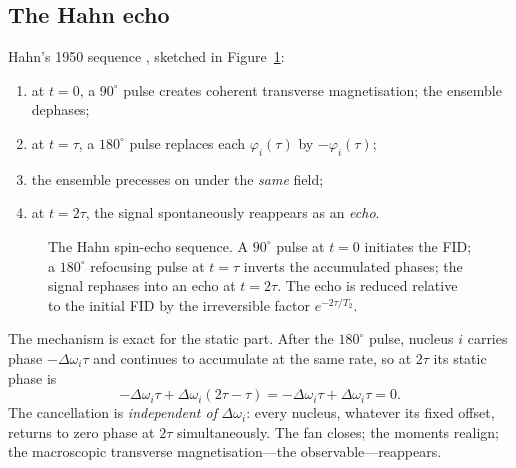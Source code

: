\documentclass[11pt,a4paper]{article}
\theoremstyle{thmstyle}
\theoremstyle{definition}
\theoremstyle{remark}
\newcommand{\Ttwo}{T_{2}}
\begin{document}
\subsection{The Hahn echo}
\label{sec:hahn}

Hahn's 1950 sequence \citep{hahn1950}, sketched in
Figure~\ref{fig:pulse}:
\begin{enumerate}[leftmargin=1.6em,itemsep=0.12em]
\item at $t=0$, a $90^{\circ}$ pulse creates coherent transverse
magnetisation; the ensemble dephases;
\item at $t=\tau$, a $180^{\circ}$ pulse replaces each
$\varphi_{i}(\tau)$ by $-\varphi_{i}(\tau)$;
\item the ensemble precesses on under the \emph{same} field;
\item at $t=2\tau$, the signal spontaneously reappears as an \emph{echo}.
\end{enumerate}

\begin{figure}[t]
\centering
{}
\caption{The Hahn spin-echo sequence. A $90^{\circ}$ pulse at $t=0$
initiates the FID; a $180^{\circ}$ refocusing pulse at $t=\tau$ inverts
the accumulated phases; the signal rephases into an echo at $t=2\tau$.
The echo is reduced relative to the initial FID by the irreversible
factor $e^{-2\tau/\Ttwo}$.}
\label{fig:pulse}
\end{figure}

The mechanism is exact for the static part. After the $180^{\circ}$
pulse, nucleus $i$ carries phase
$-\Delta\omega_{i}\tau$ and continues to accumulate at the same rate, so
at $2\tau$ its static phase is
\begin{equation}
-\Delta\omega_{i}\tau+\Delta\omega_{i}(2\tau-\tau)
=-\Delta\omega_{i}\tau+\Delta\omega_{i}\tau=0.
\label{eq:refocus}
\end{equation}
The cancellation is \emph{independent of} $\Delta\omega_{i}$: every
nucleus, whatever its fixed offset, returns to zero phase at $2\tau$
simultaneously. The fan closes; the moments realign; the macroscopic
transverse magnetisation---the observable---reappears.
\end{document}
